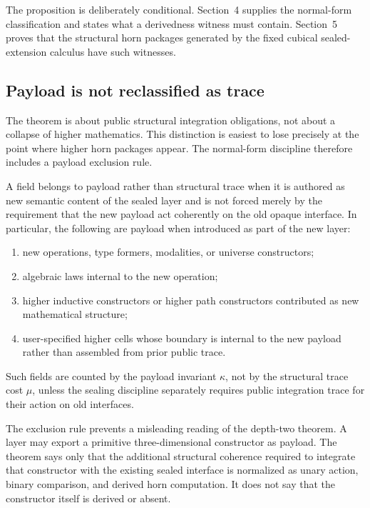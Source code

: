 The proposition is deliberately conditional.  Section~4 supplies the normal-form
classification and states what a derivedness witness must contain.  Section~5 proves that the
structural horn packages generated by the fixed cubical sealed-extension calculus have such
witnesses.

\subsection{Payload is not reclassified as trace}

The theorem is about public structural integration obligations, not about a collapse of
higher mathematics.  This distinction is easiest to lose precisely at the point where higher
horn packages appear.  The normal-form discipline therefore includes a payload exclusion
rule.

\begin{definition}
A field belongs to payload rather than structural trace when it is authored as new semantic
content of the sealed layer and is not forced merely by the requirement that the new payload
act coherently on the old opaque interface.  In particular, the following are payload when
introduced as part of the new layer:
\begin{enumerate}
\item new operations, type formers, modalities, or universe constructors;
\item algebraic laws internal to the new operation;
\item higher inductive constructors or higher path constructors contributed as new
mathematical structure;
\item user-specified higher cells whose boundary is internal to the new payload rather than
assembled from prior public trace.
\end{enumerate}
Such fields are counted by the payload invariant \(\kappa\), not by the structural trace cost
\(\mu\), unless the sealing discipline separately requires public integration trace for their
action on old interfaces.
\end{definition}

The exclusion rule prevents a misleading reading of the depth-two theorem.  A layer may
export a primitive three-dimensional constructor as payload.  The theorem says only that the
additional structural coherence required to integrate that constructor with the existing
sealed interface is normalized as unary action, binary comparison, and derived horn
computation.  It does not say that the constructor itself is derived or absent.

